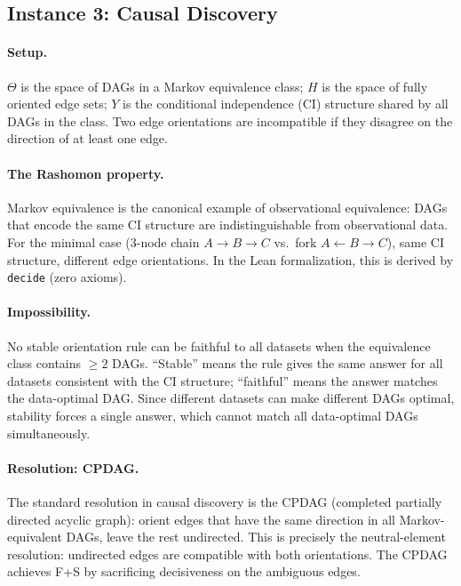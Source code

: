 \documentclass{article}
\begin{document}
\subsection{Instance 3: Causal Discovery}
\label{sec:causal}

\paragraph{Setup.}
$\Theta$ is the space of DAGs in a Markov equivalence class;
$H$ is the space of fully oriented edge sets;
$Y$ is the conditional independence (CI) structure shared by all DAGs in
the class.
Two edge orientations are incompatible if they disagree on the direction of
at least one edge.

\paragraph{The Rashomon property.}
Markov equivalence is the canonical example of observational equivalence:
DAGs that encode the same CI structure are indistinguishable from
observational data.
For the minimal case (3-node chain $A \to B \to C$ vs.\ fork
$A \leftarrow B \to C$), same CI structure, different edge orientations.
In the Lean formalization, this is derived by \texttt{decide} (zero
axioms).

\paragraph{Impossibility.}
No stable orientation rule can be faithful to all datasets when the
equivalence class contains $\geq 2$ DAGs.
``Stable'' means the rule gives the same answer for all datasets consistent
with the CI structure; ``faithful'' means the answer matches the
data-optimal DAG.
Since different datasets can make different DAGs optimal, stability forces
a single answer, which cannot match all data-optimal DAGs simultaneously.

\paragraph{Resolution: CPDAG.}
The standard resolution in causal discovery is the CPDAG (completed
partially directed acyclic graph): orient edges that have the same
direction in all Markov-equivalent DAGs, leave the rest undirected.
This is precisely the neutral-element resolution: undirected edges are
compatible with both orientations.
The CPDAG achieves F+S by sacrificing decisiveness on the ambiguous edges.
\end{document}
